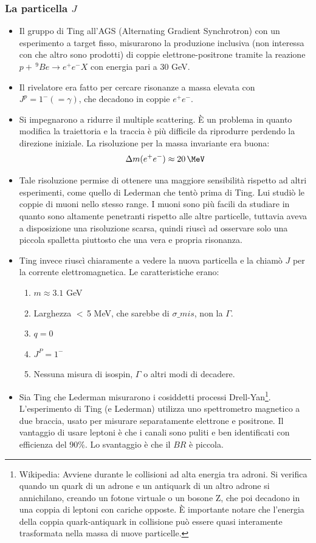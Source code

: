 \subsubsection{La particella $J$}
\begin{itemize}
    \item Il gruppo di Ting all'AGS (Alternating Gradient Synchrotron) con un esperimento a target fisso, misurarono la produzione inclusiva (non interessa con che altro sono prodotti) di coppie elettrone-positrone tramite la reazione $p+\,^9Be\to e^+e^-X$ con energia pari a 30 GeV.
    \item Il rivelatore era fatto per cercare risonanze a massa elevata con $J^p=1^- (=\gamma)$, che decadono in coppie $e^+e^-$.
    \item Si impegnarono a ridurre il multiple scattering. È un problema in quanto modifica la traiettoria e la traccia è più difficile da riprodurre perdendo la direzione iniziale. La risoluzione per la massa invariante era buona:
    \begin{equation*}
        \Delta m(e^+e^-)\approx20\,\MeV
    \end{equation*} 
    \item Tale risoluzione permise di ottenere una maggiore sensibilità rispetto ad altri esperimenti, come quello di Lederman che tentò prima di Ting. Lui studiò le coppie di muoni nello stesso range. I muoni sono più facili da studiare in quanto sono altamente penetranti rispetto alle altre particelle, tuttavia aveva a disposizione una risoluzione scarsa, quindi riuscì ad osservare solo una piccola spalletta piuttosto che una vera e propria risonanza. 
    \item Ting invece riuscì chiaramente a vedere la nuova particella e la chiamò $J$ per la corrente elettromagnetica. Le caratteristiche erano:
    \begin{enumerate}
    \item $m\approx3.1$ GeV
    \item Larghezza $<\,$5 MeV, che sarebbe di $\sigma\_{mis}$, non la $\Gamma$.
    \item $q=0$
    \item $J^P=1^-$
    \item Nessuna misura di isospin, $\Gamma$ o altri modi di decadere.
    \end{enumerate}
    \item Sia Ting che Lederman misurarono i cosiddetti processi Drell-Yan\footnote{Wikipedia: Avviene durante le collisioni ad alta energia tra adroni. Si verifica quando un quark di un adrone e un antiquark di un altro adrone si annichilano, creando un fotone virtuale o un bosone Z, che poi decadono in una coppia di leptoni con cariche opposte. È importante notare che l'energia della coppia quark-antiquark in collisione può essere quasi interamente trasformata nella massa di nuove particelle.}. L'esperimento di Ting (e Lederman) utilizza uno spettrometro magnetico a due braccia, usato per misurare separatamente elettrone e positrone. Il vantaggio di usare leptoni è che i canali sono puliti e ben identificati con efficienza del 90\%. Lo svantaggio è che il $BR$ è piccola. 

\end{itemize}
